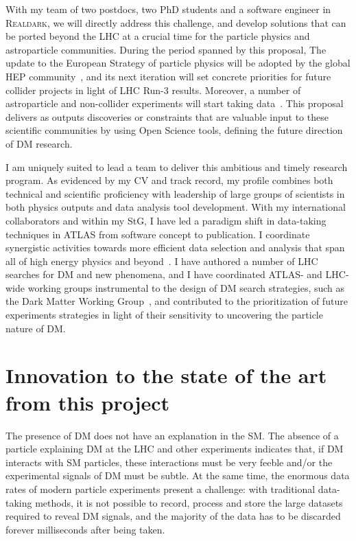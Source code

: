 \documentclass[11pt,a4paper]{article}
\begin{document}
With my team of two postdocs, two PhD students and a software engineer in \textsc{Realdark}, we will directly address this challenge, and develop solutions that can be ported beyond the LHC at a crucial time for the particle physics and astroparticle communities.  
During the period spanned by this proposal, 
The update to the European Strategy of particle physics will be adopted by the global HEP community~\cite{Strategy:2019vxc}, and its next iteration will set concrete priorities for future collider projects in light of LHC Run-3 results. 
Moreover, a number of astroparticle and non-collider experiments will start taking data~\cite{APPECStrategy,Beacham:2019nyx}. 
This proposal delivers as outputs discoveries or constraints that are valuable input to these scientific communities by using Open Science tools, defining the future direction of DM research. 

I am uniquely suited to lead a team to deliver this ambitious and timely research program.  
As evidenced by my CV and track record, my profile combines both technical and scientific proficiency with leadership of large groups of scientists in both physics outputs and data analysis tool development. 
With my international collaborators and within my StG, I have led a paradigm shift in data-taking techniques in ATLAS from software concept to publication. I coordinate synergistic activities towards more efficient data selection and analysis that span all of high energy physics and beyond~\cite{Alves:2017she}. I have authored a number of LHC searches for DM and new phenomena, and I have coordinated ATLAS- and LHC-wide working groups instrumental to the design of DM search strategies, such as the Dark Matter Working Group~\cite{DMWGWebsite}, and contributed to the prioritization of future experiments strategies in light of their sensitivity to uncovering the particle nature of DM. 

\section{Innovation to the state of the art from this project} 
\smallskip

The presence of DM does not have an explanation in the SM. 
The absence of a particle explaining DM at the LHC and other experiments indicates that, if DM interacts with SM particles, these interactions must be very feeble and/or the experimental signals of DM must be subtle. 
At the same time, the enormous data rates of modern particle experiments present a challenge: with traditional data-taking methods, it is not possible to record, process and store the large datasets required to reveal DM signals, and the majority of the data has to be discarded forever milliseconds after being taken. 
  
\end{document}
